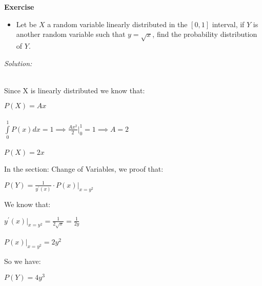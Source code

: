 \documentclass[paper=9in:6in,pagesize=pdftex,headinclude=on,footinclude=on,10pt,bibtotoc,pointlessnumbers,normalheadings,DIV=9,twoside=false]{scrbook}
\begin{document}
\date{}


\begin{large} 
 \textbf{Exercise}
\end{large} 
\begin{itemize} 
\item Let be $X$ a random variable linearly distributed in the $[0,1] $ interval, if $Y$ is another random variable such that $y = \sqrt{x}$, find the probability distribution of $Y$.
\end{itemize}

\begin{large}
\textit{Solution:\\}
\end{large}
 \begin{text}
 \ \\
 \indent Since X is linearly distributed we know that: \\
 \end{text}
 
 \begin{center}
     $P(X) =  Ax$ \\
     \ \\
    $ \int\limits_{0}^{1} P(x) dx = 1 \implies \frac{Ax^2}{2}  \Big|_0^1 = 1 \implies A=2$ \\
    \ \\
    $P(X)= 2x$
 \end{center}
 
\begin{text}
In the section: Change of Variables, we proof that: \\ 
\end{text}

\begin{center}
$P(Y)=  \frac{1}{y^{'}(x)} \cdot P(x)\big|_{x=y^2}$  \\
\end{center}

\begin{text}
We know that:
\end{text}

\begin{center}
$y^{'}(x) \big|_{x=y^2}=  \frac{1}{2\sqrt{x}} = \frac{1}{2y}$ \\
\ \\
$P(x)\big|_{x=y^2} = 2y^2$ \\
\end{center}

\begin{text}
So we have:
\end{text}

\begin{center}
$P(Y) = 4y^3$
\end{center}
\end{document}
